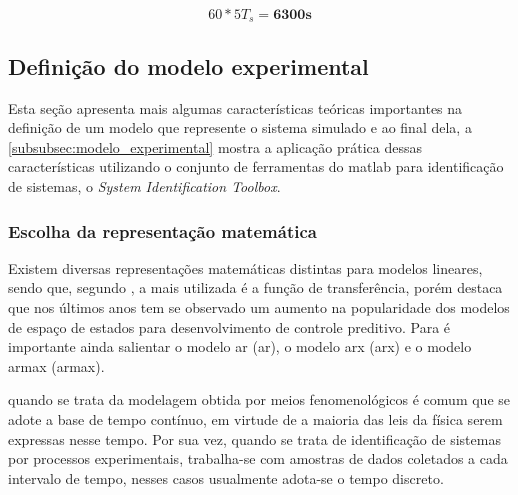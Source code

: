 \begin{equation}
	\label{eq:experiment_duration}
	60 * 5T_s = \pmb{6}\pmb{3}\pmb{0}\pmb{0}\pmb{s}
\end{equation}

\subsection{Definição do modelo experimental}
\label{subsec:definicao_modelo_experimental}

Esta seção apresenta mais algumas características teóricas importantes na definição de um modelo
que represente o sistema simulado e ao final dela, a \cref{subsubsec:modelo_experimental}
mostra a aplicação prática dessas características utilizando o conjunto de ferramentas do \acrshort{matlab}
para identificação de sistemas, o \textit{System Identification Toolbox\texttrademark}.

\subsubsection{Escolha da representação matemática}
\label{subsubsec:escolha_da_representacao_matematica}

Existem diversas representações matemáticas distintas para modelos lineares, sendo que, segundo
, a mais utilizada é a função de transferência, porém 
destaca que nos últimos anos tem se observado um aumento na popularidade dos modelos de espaço de
estados para desenvolvimento de controle preditivo. Para  é importante ainda
salientar o modelo \acrshort{ar} (\acrlong{ar}), o modelo \acrshort{arx} (\acrlong{arx}) e
o modelo \acrshort{armax} (\acrlong{armax}).

\begin{citacao}
    \text{[...]} quando se trata da modelagem obtida por meios fenomenológicos é comum que se adote a base de
    tempo contínuo, em virtude de a maioria das leis da física serem expressas nesse tempo. Por sua vez,
    quando se trata de identificação de sistemas por processos experimentais, trabalha-se com amostras
    de dados coletados a cada intervalo de tempo, nesses casos usualmente adota-se o tempo discreto.
\end{citacao}

